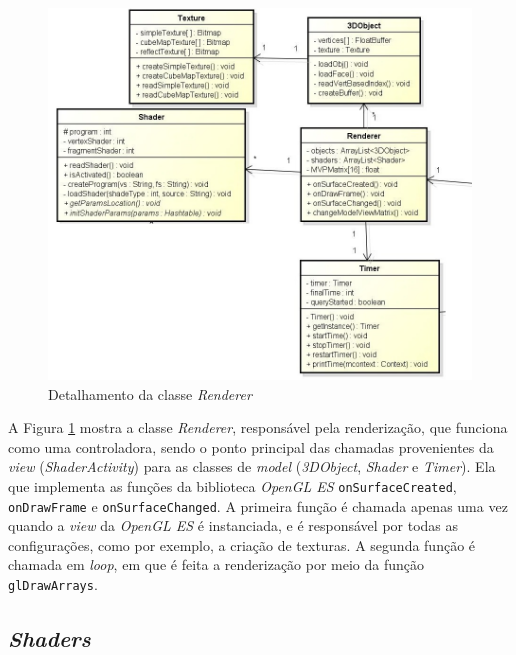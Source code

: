 	\begin{figure}[ht!]
	\centering
		\includegraphics[keepaspectratio=true,scale=0.6]{figuras/renderer.jpg}
	\caption{Detalhamento da classe \textit{Renderer}}
	\label{renderer}
	\end{figure}

	A Figura \ref{renderer} mostra a classe \textit{Renderer}, responsável pela renderização, que funciona como uma controladora, sendo o ponto principal  das chamadas provenientes da \textit{view} (\textit{ShaderActivity}) para as classes de \textit{model} (\textit{3DObject}, \textit{Shader} e \textit{Timer}). Ela que implementa as funções da biblioteca \textit{OpenGL ES} \texttt{onSurfaceCreated},  \texttt{onDrawFrame} e \texttt{onSurfaceChanged}. A primeira função é chamada apenas uma vez quando a \textit{view} da \textit{OpenGL ES} é instanciada, e é responsável por todas as configurações, como por exemplo, a criação de texturas. A segunda função é chamada em \textit{loop}, em que é feita a renderização por meio da função \texttt{glDrawArrays}. 

\subsection{\textit{Shaders}}      

